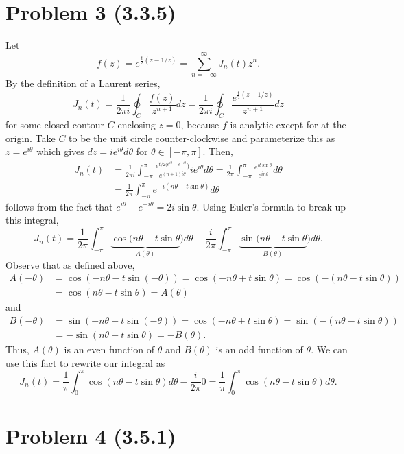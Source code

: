 \documentclass{article}
\begin{document}
\section{Problem 3 (3.3.5)}
Let 
	\[
	f(z)=e^{\frac{t}{2}(z - 1/z)} = \sum_{n=-\infty}^\infty J_n(t)z^n.
	\]
By the definition of a Laurent series, 
\[
J_n(t)=\frac{1}{2\pi i}\oint_C\frac{f(z)}{z^{n+1}}dz=\frac{1}{2\pi i}\oint_C\frac{e^{\frac{t}{2}(z - 1/z)}}{z^{n+1}}dz
\]
for some closed contour $C$ enclosing $z=0$, because $f$ is analytic except for at the origin. Take $C$ to be the unit circle counter-clockwise and parameterize this as $z=e^{i\theta}$ which gives $dz=ie^{i\theta}d\theta$ for $\theta\in[-\pi,\pi]$. Then,
\begin{align*}
    J_n(t)&=\frac{1}{2\pi i}\int_{-\pi}^\pi\frac{e^{t/2(e^{i\theta}-e^{-i\theta}})}{e^{(n+1)i\theta}}ie^{i\theta}d\theta=\frac{1}{2\pi}\int_{-\pi}^\pi \frac{e^{it\sin{\theta}}}{e^{in\theta}}d\theta\\&=
    \frac{1}{2\pi}\int_{-\pi}^\pi e^{-i(n\theta-t\sin{\theta})}d\theta
\end{align*}
follows from the fact that $e^{i\theta}-e^{-i\theta}=2i\sin{\theta}$. Using Euler's formula to break up this integral,
\[
J_n(t)=\frac{1}{2\pi}\int_{-\pi}^\pi\underbrace{\cos(n\theta-t\sin{\theta}}_{A(\theta)})d\theta-\frac{i}{2\pi}\int_{-\pi}^\pi\underbrace{\sin(n\theta-t\sin{\theta}}_{B(\theta)})d\theta.
\]
Observe that as defined above,
\begin{align*}
A(-\theta)&=\cos(-n\theta-t\sin(-\theta))=\cos(-n\theta+t\sin{\theta})=\cos(-(n\theta-t\sin{\theta}))\\&=
\cos(n\theta-t\sin{\theta})=A(\theta)
\end{align*}
and 
\begin{align*}
B(-\theta)&=\sin(-n\theta-t\sin(-\theta))=\cos(-n\theta+t\sin{\theta})=\sin(-(n\theta-t\sin{\theta}))\\&=
-\sin(n\theta-t\sin{\theta})=-B(\theta).
\end{align*}
Thus, $A(\theta)$ is an even function of $\theta$ and $B(\theta)$ is an odd function of $\theta$. We can use this fact to rewrite our integral as
\[
J_n(t)=\frac{1}{\pi}\int_{0}^\pi\cos(n\theta-t\sin{\theta})d\theta-\frac{i}{2\pi}0=\frac{1}{\pi}\int_{0}^\pi\cos(n\theta-t\sin{\theta})d\theta.
\]

\section{Problem 4 (3.5.1)}
\end{document}
